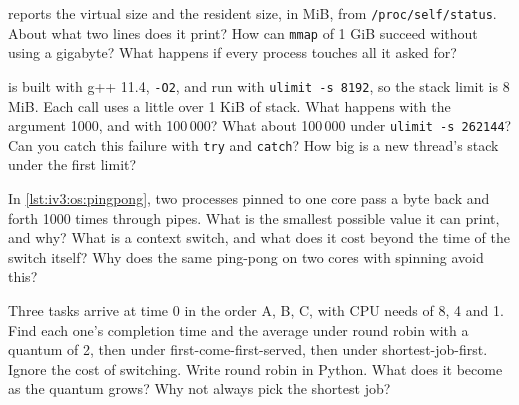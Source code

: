\begin{question}\label{iq:iv3:operating-systems-concurrency-and-networks:12}
 reports the virtual size and the resident size, in MiB, from \texttt{/proc/self/status}. About what two lines does it print? How can \texttt{mmap} of 1 GiB succeed without using a gigabyte? What happens if every process touches all it asked for?
\label{lst:iv3:os:rssvsz}
\end{question}

\begin{question}\label{iq:iv3:operating-systems-concurrency-and-networks:13}
 is built with g++ 11.4, \texttt{-O2}, and run with \texttt{ulimit -s 8192}, so the stack limit is 8 MiB. Each call uses a little over 1 KiB of stack. What happens with the argument 1000, and with 100\,000? What about 100\,000 under \texttt{ulimit -s 262144}? Can you catch this failure with \texttt{try} and \texttt{catch}? How big is a new thread's stack under the first limit?
\label{lst:iv3:os:stackdepth}
\end{question}

\begin{question}\label{iq:iv3:operating-systems-concurrency-and-networks:14}
In \cref{lst:iv3:os:pingpong}, two processes pinned to one core pass a byte back and forth 1000 times through pipes. What is the smallest possible value it can print, and why? What is a context switch, and what does it cost beyond the time of the switch itself? Why does the same ping-pong on two cores with spinning avoid this?
\label{lst:iv3:os:pingpong}
\end{question}

\begin{question}\label{iq:iv3:operating-systems-concurrency-and-networks:15}
Three tasks arrive at time 0 in the order A, B, C, with CPU needs of 8, 4 and 1. Find each one's completion time and the average under round robin with a quantum of 2, then under first-come-first-served, then under shortest-job-first. Ignore the cost of switching. Write round robin in Python. What does it become as the quantum grows? Why not always pick the shortest job?
\end{question}

